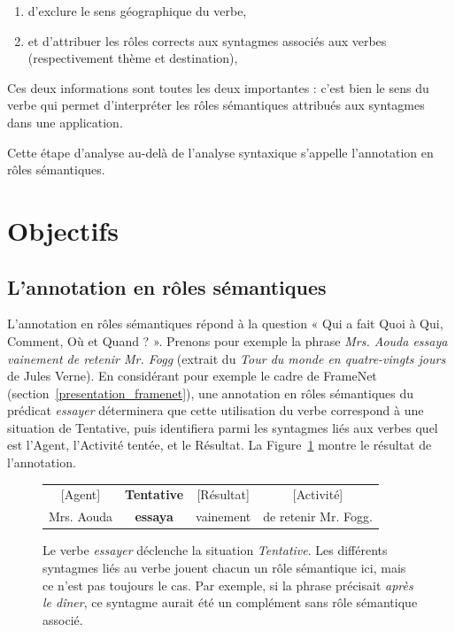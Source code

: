 \begin{enumerate}
    \item d'exclure le sens géographique du verbe,
    \item et d'attribuer les rôles corrects aux syntagmes associés aux verbes
        (respectivement thème et destination),
\end{enumerate}


Ces deux informations sont toutes les deux importantes : c'est bien le sens du
verbe qui permet d'interpréter les rôles sémantiques attribués aux syntagmes
dans une application.

Cette étape d'analyse au-delà de l'analyse syntaxique s'appelle l'annotation en
rôles sémantiques.

\section{Objectifs}
\label{objectifs_these}

\subsection{L'annotation en rôles sémantiques}

L'annotation en rôles sémantiques répond à la question « Qui a fait Quoi à Qui,
Comment, Où et Quand ? ». Prenons pour exemple la phrase \textit{Mrs. Aouda
essaya vainement de retenir Mr. Fogg} (extrait du \textit{Tour du monde en
quatre-vingts jours} de Jules Verne). En considérant pour exemple le cadre de
FrameNet (section~\ref{presentation_framenet}), une annotation en rôles
sémantiques du prédicat \textit{essayer} déterminera que cette utilisation du
verbe correspond à une situation de Tentative, puis identifiera parmi les
syntagmes liés aux verbes quel est l'Agent, l'Activité tentée, et le Résultat.
La Figure~\ref{fig:introsrl} montre le résultat de l'annotation.

\begin{figure}[ht]
    \centering
    \begin{tabular}{cccc}
    [Agent]  & \textbf{Tentative} & [Résultat]  & [Activité]         \tabularnewline
    Mrs. Aouda & \textbf{essaya}  & vainement & de retenir Mr. Fogg. \tabularnewline
    \end{tabular}
    \caption{\label{fig:introsrl}Le verbe \textit{essayer} déclenche la situation
        \textit{Tentative}. Les différents syntagmes liés au verbe jouent chacun
        un rôle sémantique ici, mais ce n'est pas toujours le cas. Par exemple,
        si la phrase précisait \textit{après le dîner}, ce syntagme aurait été un
    complément sans rôle sémantique associé.}

\end{figure}

